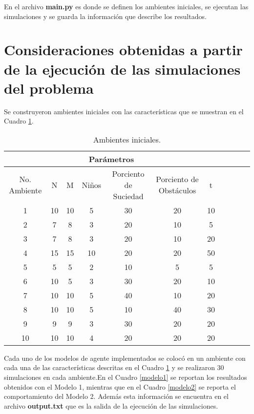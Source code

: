 \documentclass[12pt,a4paper]{article}
\begin{document}
	En el archivo \textbf{main.py} es donde se definen los ambientes iniciales, se ejecutan las simulaciones y se guarda la informaci\'on que describe los resultados.

	\section{Consideraciones obtenidas a partir de la ejecuci\'on de las simulaciones del problema}
	
	Se construyeron ambientes iniciales con las caracter\'isticas que se muestran en el Cuadro \ref{ambientes}.
	
		\begin{table}[htb]
		\centering
		\begin{tabular}{|c|c|c|c|c|c|c|c|c|c|c|}
			\hline
			\multicolumn{7}{|c|}{Par\'ametros} \\ \hline
			No. Ambiente & N & M & Ni\~nos & Porciento de Suciedad & Porciento de Obst\'aculos & t \\
			\hline
			1 & 10 & 10 & 5 & 30 & 20 & 10 \\
			\hline
			2 & 7 & 8 & 3 & 20 & 10 & 5 \\
			\hline
			3 & 7 & 8 & 3 & 20 & 10 & 20 \\
			\hline
			4 & 15 & 15 & 10 & 20 & 20 & 50 \\
			\hline
			5 & 5 & 5 & 2 & 10 & 5 & 5 \\
			\hline
			6 & 10 & 5 & 3 & 30 & 20 & 10 \\
			\hline
			7 & 10 & 10 & 5 & 40 & 10 & 20 \\
			\hline
			8 & 10 & 10 & 5 & 10 & 40 & 30 \\
			\hline
			9 & 9 & 9 & 3 & 30 & 20 & 20 \\
			\hline
			10 & 10 & 10 & 4 & 20 & 20 & 20 \\
			\hline
		\end{tabular}
		\caption{Ambientes iniciales.}
		\label{ambientes}
	\end{table}	

Cada uno de los modelos de agente implementados se coloc\'o en un ambiente con cada una de las caracter\'isticas descritas en el Cuadro \ref{ambientes} y se realizaron 30 simulaciones en cada ambiente.En el Cuadro \ref{modelo1} se reportan los resultados obtenidos con el Modelo 1, mientras que en el Cuadro \ref{modelo2} se reporta el comportamiento del Modelo 2. Adem\'as esta informaci\'on se encuentra en el archivo \textbf{output.txt} que es la salida de la ejecuci\'on de las simulaciones.
\end{document}
